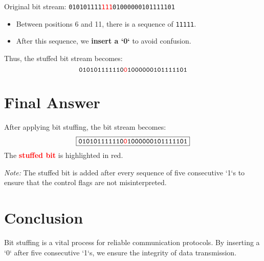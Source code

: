 \documentclass[a4paper,12pt]{article}
\begin{document}
\begin{tcolorbox}[colframe=blue, colback=blue!5, title=\textbf{Bit Stuffing Process}]
Original bit stream: \texttt{010101111\textcolor{red}{111}01000000101111101}
\begin{itemize}
    \item Between positions 6 and 11, there is a sequence of \texttt{11111}.
    \item After this sequence, we \textbf{insert a `0`} to avoid confusion.
\end{itemize}
Thus, the stuffed bit stream becomes:
\[
\texttt{010101111110\textcolor{red}{0}1000000101111101}
\]
\end{tcolorbox}

\section*{Final Answer}
After applying bit stuffing, the bit stream becomes:
\[
\boxed{\texttt{010101111110\textcolor{red}{0}1000000101111101}}
\]
The \textcolor{red}{\textbf{stuffed bit}} is highlighted in red.

\vspace{1cm}
\textit{Note:} The stuffed bit is added after every sequence of five consecutive `1`s to ensure that the control flags are not misinterpreted.

\section*{Conclusion}
Bit stuffing is a vital process for reliable communication protocols. By inserting a `0` after five consecutive `1`s, we ensure the integrity of data transmission.
\end{document}
